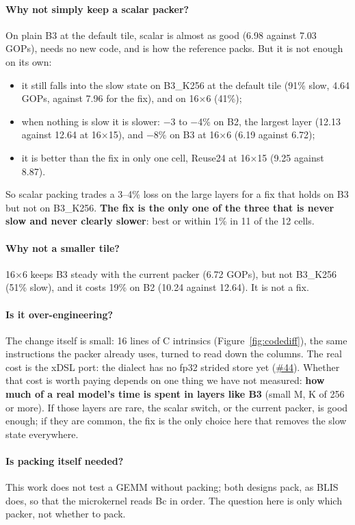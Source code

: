 \documentclass[10pt,a4paper]{article}
\newcommand{\iss}[1]{\href{https://github.com/JieGH/RVV_code_gen_via_MLIR_xDSL/issues/#1}{\##1}}
\newcommand{\key}[1]{\textbf{\textcolor{blue!55!black}{#1}}}  %
\begin{document}
\paragraph{Why not simply keep a scalar packer?} On plain B3 at the default tile, scalar is almost as good (6.98 against 7.03 GOPs),
needs no new code, and is how the reference packs. But it is not enough on its own:
\begin{itemize}
  \item it still falls into the slow state on B3\_K256 at the default tile (91\% slow, 4.64 GOPs, against 7.96 for the fix), and on
  16$\times$6 (41\%);
  \item when nothing is slow it is slower: $-$3 to $-$4\% on B2, the largest layer (12.13 against 12.64 at 16$\times$15), and
  $-$8\% on B3 at 16$\times$6 (6.19 against 6.72);
  \item it is better than the fix in only one cell, Reuse24 at 16$\times$15 (9.25 against 8.87).
\end{itemize}
So scalar packing trades a 3--4\% loss on the large layers for a fix that holds on B3 but not on B3\_K256. \key{The fix is the only one of
the three that is never slow and never clearly slower}: best or within 1\% in 11 of the 12 cells.

\paragraph{Why not a smaller tile?} 16$\times$6 keeps B3 steady with the current packer (6.72 GOPs), but not B3\_K256 (51\% slow), and it
costs 19\% on B2 (10.24 against 12.64). It is not a fix.

\paragraph{Is it over-engineering?} The change itself is small: 16 lines of C intrinsics (Figure~\ref{fig:codediff}), the same
instructions the packer already uses, turned to read down the columns. The real cost is the xDSL port: the dialect has no fp32 strided
store yet (\iss{44}). Whether that cost is worth paying depends on one thing we have not measured: \textbf{how much of a real model's
time is spent in layers like B3} (small M, K of 256 or more). If those layers are rare, the scalar switch, or the current packer, is
good enough; if they are common, the fix is the only choice here that removes the slow state everywhere.

\paragraph{Is packing itself needed?} This work does not test a GEMM without packing; both designs pack, as BLIS does, so that the
microkernel reads Bc in order. The question here is only which packer, not whether to pack.
\end{document}
